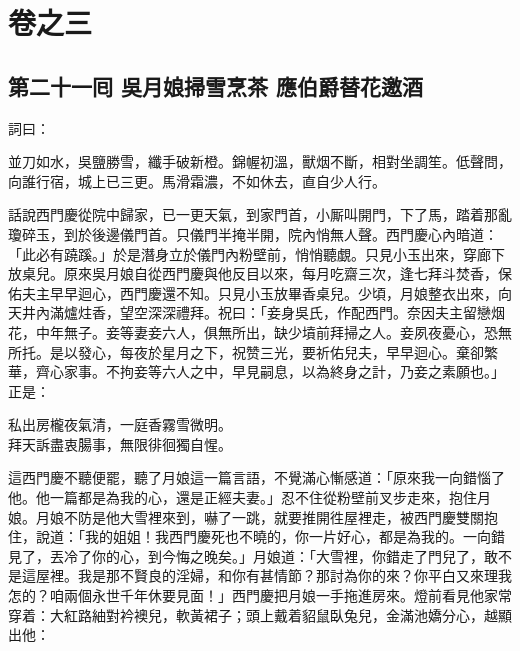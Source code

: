 \part*{{\titlename}卷之三}



\chapter*{第二十一囘 吳月娘掃雪烹茶 應伯爵替花邀酒}


詞曰：

\begin{myquote} 
並刀如水，吳鹽勝雪，纖手破新橙。錦幄初溫，獸烟不斷，相對坐調笙。低聲問，向誰行宿，城上已三更。馬滑霜濃，不如休去，直自少人行。

\end{myquote} 

話說西門慶從院中歸家，已一更天氣，到家門首，小厮叫開門，下了馬，踏着那亂瓊碎玉，到於後邊儀門首。只儀門半掩半開，院內悄無人聲。西門慶心內暗道：「此必有蹺蹊。」{}於是潛身立於儀門內粉壁前，悄悄聽覷。只見小玉出來，穿廊下放桌兒。原來吳月娘自從西門慶與他反目以來，{}每月吃齋三次，逢七拜斗焚香，保佑夫主早早迴心，西門慶還不知。只見小玉放畢香桌兒。少頃，月娘整衣出來，向天井內滿爐炷香，望空深深禮拜。祝曰：「妾身吳氏，作配西門。奈因夫主留戀烟花，中年無子。妾等妻妾六人，俱無所出，缺少墳前拜掃之人。妾夙夜憂心，恐無所托。是以發心，每夜於星月之下，祝赞三光，要祈佑兒夫，早早迴心。棄卻繁華，齊心家事。不拘妾等六人之中，早見嗣息，以為終身之計，乃妾之素願也。」{}正是：

\begin{myquote} 
私出房櫳夜氣清，一庭香霧雪微明。\\拜天訴盡衷腸事，無限徘徊獨自惺。
\end{myquote} 

這西門慶不聽便罷，聽了月娘這一篇言語，不覺滿心慚感道：「原來我一向錯惱了他。他一篇都是為我的心，還是正經夫妻。」忍不住從粉壁前叉步走來，抱住月娘。月娘不防是他大雪裡來到，嚇了一跳，就要推開徃屋裡走，被西門慶雙關抱住，說道：「我的姐姐！我西門慶死也不曉的，你一片好心，都是為我的。一向錯見了，丟冷了你的心，到今悔之晚矣。」月娘道：「大雪裡，你錯走了門兒了，敢不是這屋裡。我是那不賢良的淫婦，和你有甚情節？那討為你的來？你平白又來理我怎的？咱兩個永世千年休要見面！」西門慶把月娘一手拖進房來。燈前看見他家常穿着：大紅路紬對衿襖兒，軟黃裙子；頭上戴着貂鼠臥兔兒，金滿池嬌分心，越顯出他：

